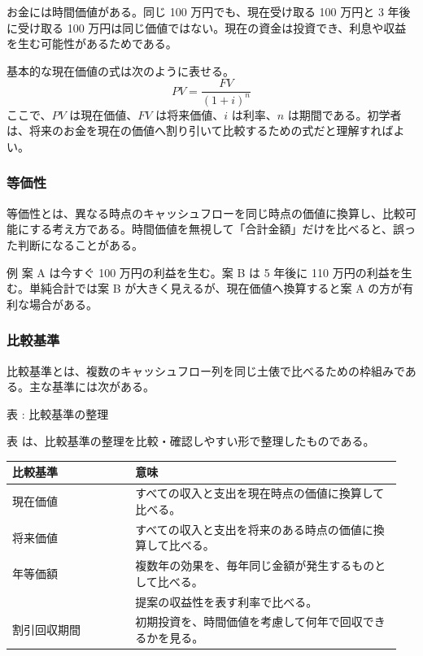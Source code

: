 お金には時間価値がある。同じ 100 万円でも、現在受け取る 100 万円と 3 年後に受け取る 100 万円は同じ価値ではない。現在の資金は投資でき、利息や収益を生む可能性があるためである。

基本的な現在価値の式は次のように表せる。
\[
PV = \frac{FV}{(1+i)^n}
\]
ここで、$PV$ は現在価値、$FV$ は将来価値、$i$ は利率、$n$ は期間である。初学者は、将来のお金を現在の価値へ割り引いて比較するための式だと理解すればよい。

\subsubsection{等価性}

等価性とは、異なる時点のキャッシュフローを同じ時点の価値に換算し、比較可能にする考え方である。時間価値を無視して「合計金額」だけを比べると、誤った判断になることがある。

\begin{notebox}{例}
案 A は今すぐ 100 万円の利益を生む。案 B は 5 年後に 110 万円の利益を生む。単純合計では案 B が大きく見えるが、現在価値へ換算すると案 A の方が有利な場合がある。
\end{notebox}

\subsubsection{比較基準}

比較基準とは、複数のキャッシュフロー列を同じ土俵で比べるための枠組みである。主な基準には次がある。

\par\smallskip\noindent{}\label{tab:ch15-03}表 \thetable: 比較基準の整理\par\smallskip
表 \thetable は、比較基準の整理を比較・確認しやすい形で整理したものである。\par\smallskip
\begin{longtable}{L{0.30\linewidth} L{0.65\linewidth}}
\toprule
比較基準 & 意味 \\
\midrule
現在価値 & すべての収入と支出を現在時点の価値に換算して比べる。 \\
将来価値 & すべての収入と支出を将来のある時点の価値に換算して比べる。 \\
年等価額 & 複数年の効果を、毎年同じ金額が発生するものとして比べる。 \\
 & 提案の収益性を表す利率で比べる。 \\
割引回収期間 & 初期投資を、時間価値を考慮して何年で回収できるかを見る。 \\
\bottomrule
\end{longtable}

